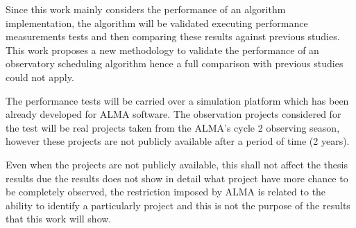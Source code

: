 Since this work mainly considers the performance of an algorithm implementation, the algorithm will be validated
executing performance measurements tests and then comparing these results against previous
studies. This work proposes a new methodology to validate the performance of an observatory
scheduling algorithm hence a full comparison with previous studies could not apply.

The performance tests will be carried over a simulation platform which has been already
developed for ALMA software. The observation projects considered for the test will be real
projects taken from the ALMA’s cycle 2 observing season, however these projects are not publicly
available after a period of time (2 years).

Even when the projects are not publicly available, this shall not affect the thesis results due the
results does not show in detail what project have more chance to be completely observed, the
restriction imposed by ALMA is related to the ability to identify a particularly project and this is
not the purpose of the results that this work will show.
